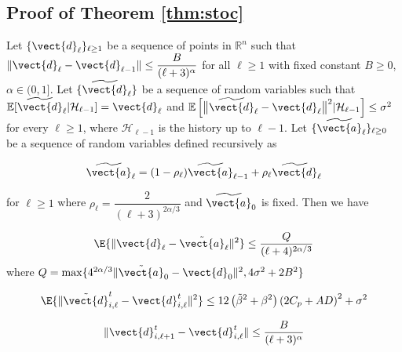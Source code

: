 \subsection{Proof of Theorem \ref{thm:stoc}}

\begin{lemma}
\label{lmm:red_var}
Let $\{\vect{d}_{\ell}\}_{\ell \geq 1}$ be a sequence of points in $\mathbb{R}^n$ such that $\|\vect{d}_{\ell} - \vect{d}_{\ell-1}\| \leq \dfrac{B}{(\ell +3)^{\alpha}}$ for all $\ell \geq 1$ with fixed constant $B \geq 0$, $\alpha \in (0,1]$. Let $\{ \widetilde{\vect{d}}_{\ell} \}$ be a sequence of random variables such that $\mathbb{E} [\widetilde{\vect{d}}_{\ell}|\mathcal{H}_{\ell-1}] = \vect{d}_{\ell}$ and $\mathbb{E} \left[ \bigl \| \widetilde{\vect{d}}_{\ell} - \vect{d}_{\ell} \bigr \|^2 | \mathcal{H}_{\ell-1} \right] \leq \sigma^2$ for every $\ell \geq 1$, where $\mathcal{H}_{\ell - 1}$ is the history up to $\ell-1$. Let $\{ \widetilde{\vect{a}}_{\ell}\}_{\ell \geq 0}$ be a sequence of random variables defined recursively as  
\begin{linenomath}
    \[ \widetilde{\vect{a}}_{\ell} = (1 - \rho_{\ell}) \widetilde{\vect{a}}_{\ell-1} + \rho_{\ell} \widetilde{\vect{d}}_{\ell} \] 
\end{linenomath}
%
for $\ell \geq 1$ where  $\rho_{\ell} = \dfrac{2}{(\ell+3)^{2\alpha/3}}$ and 
$\widetilde{\vect{a}}_{0}$ is fixed. Then we have 

\begin{equation*}
        \E{\|\vect{d}_{\ell} - \Tilde{\vect{a}}_{\ell} \|^2} \leq \frac{Q}{(\ell + 4)^{2\alpha/3}}
\end{equation*}
where $Q = \max\{4^{2\alpha/3}\|\Tilde{\vect{a}}_0 - \vect{d}_0\|^2, 4\sigma^2 + 2B^2\}$
\end{lemma}

\begin{lemma}[DMFW]
\begin{equation*}
    \E{\|\Tilde{\vect{d}}^t_{i,\ell} - \vect{d}^t_{i,\ell} \|^2} \leq 12\left(\Tilde{\beta}^2 + \beta^2\right) \left(2C_p + AD \right)^2 + \sigma^2
\end{equation*}
\end{lemma}

\begin{claim}[DMFW]
\begin{equation*}
    \| \vect{d}^t_{i,\ell+1} - \vect{d}^t_{i, \ell} \| \leq \frac{B}{(\ell+3)^{\alpha}} 
\end{equation*}
\end{claim}

